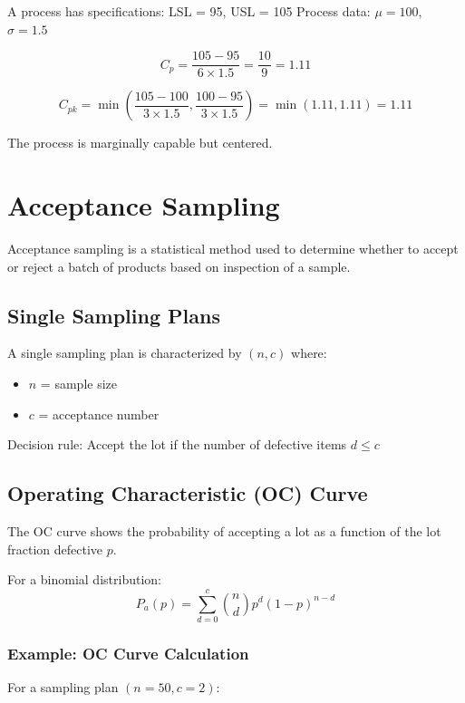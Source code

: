 \documentclass[twoside]{book}
\begin{document}
A process has specifications: LSL = 95, USL = 105
Process data: $\mu = 100$, $\sigma = 1.5$

$$C_p = \frac{105 - 95}{6 \times 1.5} = \frac{10}{9} = 1.11$$

$$C_{pk} = \min\left(\frac{105 - 100}{3 \times 1.5}, \frac{100 - 95}{3 \times 1.5}\right) = \min(1.11, 1.11) = 1.11$$

The process is marginally capable but centered.

\section{Acceptance Sampling}

Acceptance sampling is a statistical method used to determine whether to accept or reject a batch of products based on inspection of a sample.

\subsection{Single Sampling Plans}

A single sampling plan is characterized by $(n, c)$ where:
\begin{itemize}
    \item $n$ = sample size
    \item $c$ = acceptance number
\end{itemize}

Decision rule: Accept the lot if the number of defective items $d \leq c$

\subsection{Operating Characteristic (OC) Curve}

The OC curve shows the probability of accepting a lot as a function of the lot fraction defective $p$.

For a binomial distribution:
$$P_a(p) = \sum_{d=0}^{c} \binom{n}{d} p^d (1-p)^{n-d}$$

\subsubsection{Example: OC Curve Calculation}

For a sampling plan $(n=50, c=2)$:

\begin{figure}[H]
\centering
{}
\end{figure}
\end{document}
